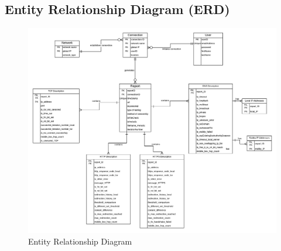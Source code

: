 \subsection{Entity Relationship Diagram (ERD)}
\begin{figure}[H]
    \centering
    \includegraphics[width=\textwidth]{Diagrams/ERD_latest.png}
    \caption{Entity Relationship Diagram}
    \label{fig:ucdns}
\end{figure}